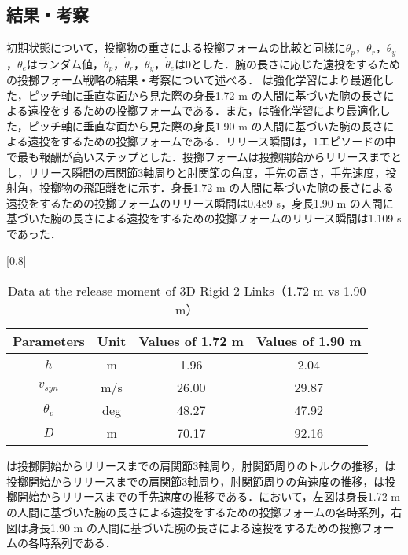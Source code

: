 \begin{small}
\subsection{結果・考察}
初期状態について，投擲物の重さによる投擲フォームの比較と同様に$\theta_{p}$，$\theta_{r}$，$\theta_{y}$，$\theta_{e}$はランダム値，$\dot{\theta}_{p}$，$\dot{\theta}_{r}$，$\dot{\theta}_{y}$，$\dot{\theta}_{e}$は0とした．腕の長さに応じた遠投をするための投擲フォーム戦略の結果・考察について述べる．
は強化学習により最適化した，ピッチ軸に垂直な面から見た際の身長1.72 m の人間に基づいた腕の長さによる遠投をするための投擲フォームである．また，は強化学習により最適化した，ピッチ軸に垂直な面から見た際の身長1.90 m の人間に基づいた腕の長さによる遠投をするための投擲フォームである．リリース瞬間は，1エピソードの中で最も報酬が高いステップとした．投擲フォームは投擲開始からリリースまでとし，リリース瞬間の肩関節3軸周りと肘関節の角度，手先の高さ，手先速度，投射角，投擲物の飛距離をに示す．身長1.72 m の人間に基づいた腕の長さによる遠投をするための投擲フォームのリリース瞬間は0.489 s，身長1.90 m の人間に基づいた腕の長さによる遠投をするための投擲フォームのリリース瞬間は1.109 sであった．
\begin{table}[tb]
  \begin{center}
    \caption{Data at the release moment of 3D Rigid 2 Links（1.72 m vs 1.90 m）}
    \scalebox{0.8}[0.8]{
    \begin{tabular}{c|c|c|c}
      \hline
      Parameters & Unit & Values of 1.72 m & Values of 1.90 m \\
      \hline
      $h$ & m & 1.96 & 2.04 \\
      $v_{syn}$ & m/s & 26.00 & 29.87 \\
      $\theta_{v}$ & deg & 48.27 & 47.92 \\
      $D$ & m & 70.17 & 92.16 \\
      \hline
    \end{tabular}
    }
  \end{center}
\end{table}
は投擲開始からリリースまでの肩関節3軸周り，肘関節周りのトルクの推移，は投擲開始からリリースまでの肩関節3軸周り，肘関節周りの角速度の推移，は投擲開始からリリースまでの手先速度の推移である．において，左図は身長1.72 m の人間に基づいた腕の長さによる遠投をするための投擲フォームの各時系列，右図は身長1.90 m の人間に基づいた腕の長さによる遠投をするための投擲フォームの各時系列である．\\

\end{small}
